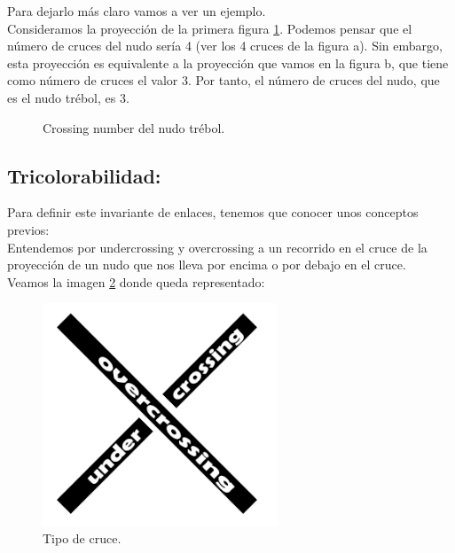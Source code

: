Para dejarlo más claro vamos a ver un ejemplo.\\
Consideramos la proyección de la primera figura \ref{cross1}. Podemos pensar que el número de cruces del nudo sería 4 (ver los 4 cruces de la figura a). Sin embargo, esta proyección es equivalente a la proyección que vamos en la figura b, que tiene como número de cruces el valor 3. Por tanto, el número de cruces del nudo, que es el nudo trébol, es 3. 
\begin{figure}[h!]
	\centering
	\caption{Crossing number del nudo trébol.}
	\label{cross1} 
\end{figure}  


\begin{center}
	\subsection{Tricolorabilidad:}
\end{center}
Para definir este invariante de enlaces, tenemos que conocer unos conceptos previos:\\
Entendemos por undercrossing y overcrossing a un recorrido en el cruce de la proyección de un nudo que nos lleva por encima o por debajo en el cruce. \\

Veamos la imagen \ref{tric1} donde queda representado:\\
\begin{figure}[h!]
	\centering
	\includegraphics[width=7cm]{inudos/cruce.png}
	\caption{Tipo de cruce.}
	\label{tric1} 
\end{figure}

